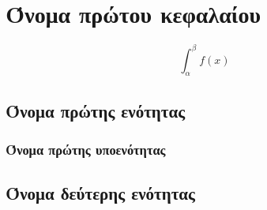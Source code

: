 
\chapter{Όνομα πρώτου κεφαλαίου}

$$\int_\alpha^\beta f(x)$$

\section{Όνομα πρώτης ενότητας}

\subsection{Όνομα πρώτης υποενότητας}


\section{Όνομα δεύτερης ενότητας}








\endinput
